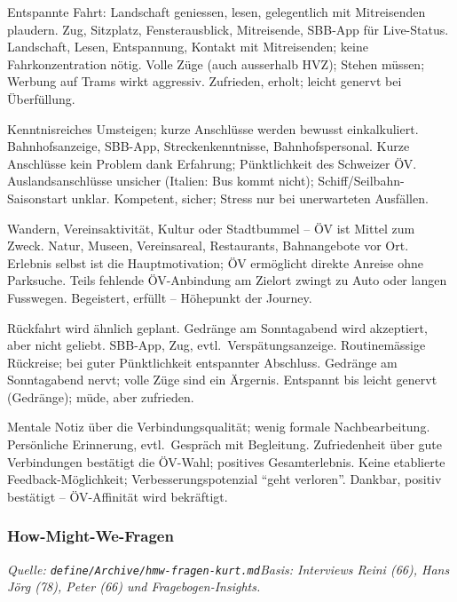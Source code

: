 {Entspannte Fahrt: Landschaft geniessen, lesen, gelegentlich mit Mitreisenden plaudern.}
{Zug, Sitzplatz, Fensterausblick, Mitreisende, SBB-App für Live-Status.}
{Landschaft, Lesen, Entspannung, Kontakt mit Mitreisenden; keine Fahrkonzentration nötig.}
{Volle Züge (auch ausserhalb HVZ); Stehen müssen; Werbung auf Trams wirkt aggressiv.}
{Zufrieden, erholt; leicht genervt bei Überfüllung.}

{Kenntnisreiches Umsteigen; kurze Anschlüsse werden bewusst einkalkuliert.}
{Bahnhofsanzeige, SBB-App, Streckenkenntnisse, Bahnhofspersonal.}
{Kurze Anschlüsse kein Problem dank Erfahrung; Pünktlichkeit des Schweizer ÖV.}
{Auslandsanschlüsse unsicher (Italien: Bus kommt nicht); Schiff/Seilbahn-Saisonstart unklar.}
{Kompetent, sicher; Stress nur bei unerwarteten Ausfällen.}

{Wandern, Vereinsaktivität, Kultur oder Stadtbummel -- ÖV ist Mittel zum Zweck.}
{Natur, Museen, Vereinsareal, Restaurants, Bahnangebote vor Ort.}
{Erlebnis selbst ist die Hauptmotivation; ÖV ermöglicht direkte Anreise ohne Parksuche.}
{Teils fehlende ÖV-Anbindung am Zielort zwingt zu Auto oder langen Fusswegen.}
{Begeistert, erfüllt -- Höhepunkt der Journey.}

{Rückfahrt wird ähnlich geplant. Gedränge am Sonntagabend wird akzeptiert, aber nicht geliebt.}
{SBB-App, Zug, evtl.\ Verspätungsanzeige.}
{Routinemässige Rückreise; bei guter Pünktlichkeit entspannter Abschluss.}
{Gedränge am Sonntagabend nervt; volle Züge sind ein Ärgernis.}
{Entspannt bis leicht genervt (Gedränge); müde, aber zufrieden.}

{Mentale Notiz über die Verbindungsqualität; wenig formale Nachbearbeitung.}
{Persönliche Erinnerung, evtl.\ Gespräch mit Begleitung.}
{Zufriedenheit über gute Verbindungen bestätigt die ÖV-Wahl; positives Gesamterlebnis.}
{Keine etablierte Feedback-Möglichkeit; Verbesserungspotenzial \enquote{geht verloren}.}
{Dankbar, positiv bestätigt -- ÖV-Affinität wird bekräftigt.}

\clearpage
\subsubsection{How-Might-We-Fragen}
\textit{Quelle: \texttt{define/Archive/hmw-fragen-kurt.md}\quad Basis: Interviews Reini (66), Hans Jörg (78), Peter (66) und Fragebogen-Insights.}


